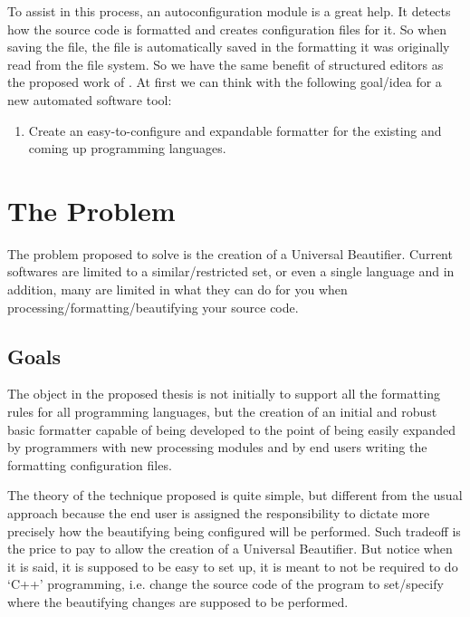 To assist in this process, an autoconfiguration module is a great help. It
detects how the source code is formatted and creates configuration files for
it. So when saving the file, the file is automatically saved in the
formatting it was originally read from the file system. So we have the same
benefit of structured editors as the proposed work of
\textcite{structuredEditorStudy}. At first we can think with the following
goal/idea for a new automated software tool:

\medskip
\begin{bluebox}
\begin{enumerate}[nolistsep]
    \item Create an easy-to-configure and expandable formatter for the
    existing and coming up programming languages.
\end{enumerate}
\end{bluebox}



\section{The Problem}

The problem proposed to solve is the creation of a Universal Beautifier.
Current softwares are limited to a similar/restricted set, or even a single
language and in addition, many are limited in what they can do for you when
processing/formatting/beautifying your source code.
\cite{universalCodeFormatter}


\subsection{Goals}

The object in the proposed thesis is not initially to support all the
formatting rules for all programming languages, but the creation of an
initial and robust basic formatter capable of being developed to the point
of being easily expanded by programmers with new processing modules and by
end users writing the formatting configuration files.

The theory of the technique proposed is quite simple, but different from the
usual approach because the end user is assigned the responsibility to
dictate more precisely how the beautifying being configured will be
performed. Such tradeoff is the price to pay to allow the creation of a
Universal Beautifier. But notice when it is said, it is supposed to be easy
to set up, it is meant to not be required to do `C++' programming, i.e.
change the source code of the program to set/specify where the beautifying
changes are supposed to be performed.


